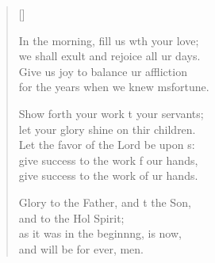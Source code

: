 \begin{verse}[\versewidth]
\begin{patverse}
In the morning, fill us w\pointup{\i}th your love;\Med\\
we shall exult and rejoice all ur days.\\
Give us joy to balance ur affliction\Med\\
for the years when we knew m\pointup{\i}sfortune.

Show forth your work t your servants;\Med\\
let your glory shine on thir children.\\
Let the favor of the Lord be upon s:\Flex\\
give success to the work f our hands,\Med\\
give success to the work of ur hands.

Glory to the Father, and t the Son,\Med\\
and to the Hol Spirit;\\
as it was in the beginn\pointup{\i}ng, is now,\Med\\
and will be for ever, men.
  \end{patverse}
\end{verse}
